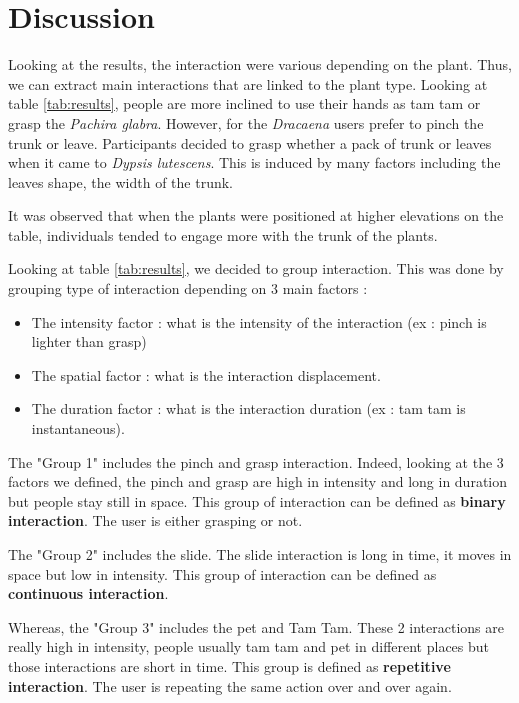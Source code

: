 \section{Discussion}

Looking at the results, the interaction were various depending on the plant. 
Thus, we can extract main interactions that are linked to the plant type. 
Looking at table \ref{tab:results}, people are more inclined to use their hands as tam tam or grasp the \textit{Pachira glabra}. 
However, for the \textit{Dracaena} users prefer to pinch the trunk or leave. 
Participants decided to grasp whether a pack of trunk or leaves when it came to \textit{Dypsis lutescens}.
This is induced by many factors including the leaves shape, the width of the trunk.


It was observed that when the plants were positioned at higher elevations on the table, individuals tended to engage more with the trunk of the plants.

Looking at table \ref{tab:results}, we decided to group interaction. This was done by grouping type of interaction depending on 3 main factors :

\begin{itemize}
    \item The intensity factor : what is the intensity of the interaction (ex : pinch is lighter than grasp)
    \item The spatial factor : what is the interaction displacement.
    \item The duration factor : what is the interaction duration (ex : tam tam is instantaneous).
\end{itemize}

The "Group 1" includes the pinch and grasp interaction. Indeed, looking at the 3 factors we defined, 
the pinch and grasp are high in intensity and long in duration but people stay still in space.
This group of interaction can be defined as \textbf{binary interaction}. The user is either grasping or not.

The "Group 2" includes the slide. The slide interaction is long in time, it moves in space but low in intensity.
This group of interaction can be defined as \textbf{continuous interaction}.


Whereas, the "Group 3" includes the pet and Tam Tam. 
These 2 interactions are really high in intensity, people usually tam tam and pet in different places but those interactions are short in time. 
This group is defined as \textbf{repetitive interaction}. The user is repeating the same action over and over again.


